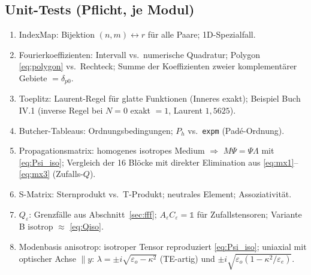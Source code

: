 \subsection{Unit-Tests (Pflicht, je Modul)}
\begin{enumerate}[nosep]
  \item IndexMap: Bijektion $(n,m)\leftrightarrow r$ für alle Paare; 1D-Spezialfall.
  \item Fourierkoeffizienten: Intervall vs.\ numerische Quadratur; Polygon \eqref{eq:polygon} vs.\ Rechteck;
        Summe der Koeffizienten zweier komplementärer Gebiete $=\delta_{p0}$.
  \item Toeplitz: Laurent-Regel für glatte Funktionen (Inneres exakt); Beispiel Buch IV.1
        (inverse Regel bei $N=0$ exakt $=1$, Laurent $1{,}5625$).
  \item Butcher-Tableaus: Ordnungsbedingungen; $P_h$ vs.\ \verb|expm| (Padé-Ordnung).
  \item Propagationsmatrix: homogenes isotropes Medium $\Rightarrow$ $M\Psi=\Psi\Lambda$ mit \eqref{eq:Psi_iso};
        Vergleich der 16 Blöcke mit direkter Elimination aus \eqref{eq:mx1}--\eqref{eq:mx3} (Zufalls-$Q$).
  \item S-Matrix: Sternprodukt vs.\ T-Produkt; neutrales Element; Assoziativität.
  \item $Q_\varepsilon$: Grenzfälle aus Abschnitt~\ref{sec:fff}; $A_\varepsilon C_\varepsilon=\mathbb 1$ für Zufallstensoren;
        Variante B isotrop $\approx$ \eqref{eq:Qiso}.
  \item Modenbasis anisotrop: isotroper Tensor reproduziert \eqref{eq:Psi_iso}; uniaxial mit optischer Achse
        $\parallel y$: $\lambda=\pm i\sqrt{\varepsilon_o-\kappa^2}$ (TE-artig) und $\pm i\sqrt{\varepsilon_o(1-\kappa^2/\varepsilon_e)}$.
\end{enumerate}

